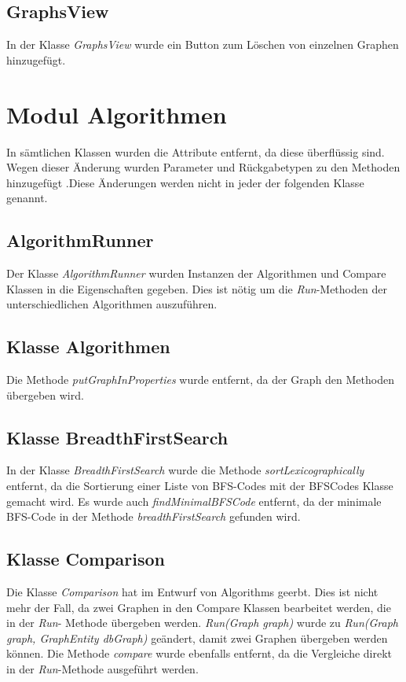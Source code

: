 \documentclass[13pt]{scrreprt}
\begin{document}
	\subsection{GraphsView}
	In der Klasse \textit{GraphsView} wurde ein Button zum Löschen von einzelnen Graphen hinzugefügt.
	
	\newpage
\section{Modul Algorithmen}
In sämtlichen Klassen wurden die Attribute entfernt, da diese überflüssig sind. Wegen dieser Änderung wurden Parameter und Rückgabetypen zu den Methoden hinzugefügt .Diese Änderungen werden nicht in jeder der folgenden Klasse genannt.

\subsection{AlgorithmRunner}
Der Klasse \textit{AlgorithmRunner} wurden Instanzen der Algorithmen und Compare Klassen in die Eigenschaften gegeben. Dies ist nötig um die \textit{Run}-Methoden der unterschiedlichen Algorithmen auszuführen. 

\subsection{Klasse Algorithmen}
Die Methode \textit{putGraphInProperties} wurde entfernt, da der Graph den Methoden übergeben wird.

\subsection{Klasse BreadthFirstSearch}
In der Klasse \textit{BreadthFirstSearch} wurde die Methode \textit{sortLexicographically} entfernt, da die Sortierung einer Liste von BFS-Codes mit der BFSCodes Klasse gemacht wird.
Es wurde auch \textit{findMinimalBFSCode} entfernt, da der minimale BFS-Code in der Methode \textit{breadthFirstSearch} gefunden wird.

\subsection{Klasse Comparison}
Die Klasse \textit{Comparison} hat im Entwurf von Algorithms geerbt. Dies ist nicht mehr der Fall, da zwei Graphen in den Compare Klassen bearbeitet werden, die in der \textit{Run}- Methode übergeben werden. 
\textit{Run(Graph graph)} wurde zu \textit{Run(Graph graph, GraphEntity dbGraph)} geändert, damit zwei Graphen übergeben werden können. 
Die Methode \textit{compare} wurde ebenfalls entfernt, da die Vergleiche direkt in der \textit{Run}-Methode ausgeführt werden.
\end{document}
